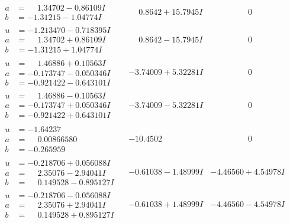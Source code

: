 \documentclass[1p]{elsarticle_modified}
\theoremstyle{definition}
\begin{document}
$$\begin{array}{c|c|c}
\begin{aligned}
a &= \phantom{-}1.34702 - 0.86109 I \\
b &= -1.31215 - 1.04774 I\end{aligned}
 & \phantom{-}0.8642 + 15.7945 I & \phantom{-0.000000 } 0 \\ \hline\begin{aligned}
u &= -1.213470 - 0.718395 I \\
a &= \phantom{-}1.34702 + 0.86109 I \\
b &= -1.31215 + 1.04774 I\end{aligned}
 & \phantom{-}0.8642 - 15.7945 I & \phantom{-0.000000 } 0 \\ \hline\begin{aligned}
u &= \phantom{-}1.46886 + 0.10563 I \\
a &= -0.173747 - 0.050346 I \\
b &= -0.921422 - 0.643101 I\end{aligned}
 & -3.74009 + 5.32281 I & \phantom{-0.000000 } 0 \\ \hline\begin{aligned}
u &= \phantom{-}1.46886 - 0.10563 I \\
a &= -0.173747 + 0.050346 I \\
b &= -0.921422 + 0.643101 I\end{aligned}
 & -3.74009 - 5.32281 I & \phantom{-0.000000 } 0 \\ \hline\begin{aligned}
u &= -1.64237\phantom{ +0.000000I} \\
a &= \phantom{-}0.00866580\phantom{ +0.000000I} \\
b &= -0.265959\phantom{ +0.000000I}\end{aligned}
 & -10.4502\phantom{ +0.000000I} & \phantom{-0.000000 } 0 \\ \hline\begin{aligned}
u &= -0.218706 + 0.056088 I \\
a &= \phantom{-}2.35076 - 2.94041 I \\
b &= \phantom{-}0.149528 - 0.895127 I\end{aligned}
 & -0.61038 - 1.48999 I & -4.46560 + 4.54978 I \\ \hline\begin{aligned}
u &= -0.218706 - 0.056088 I \\
a &= \phantom{-}2.35076 + 2.94041 I \\
b &= \phantom{-}0.149528 + 0.895127 I\end{aligned}
 & -0.61038 + 1.48999 I & -4.46560 - 4.54978 I\\

\end{array}$$
\end{document}
